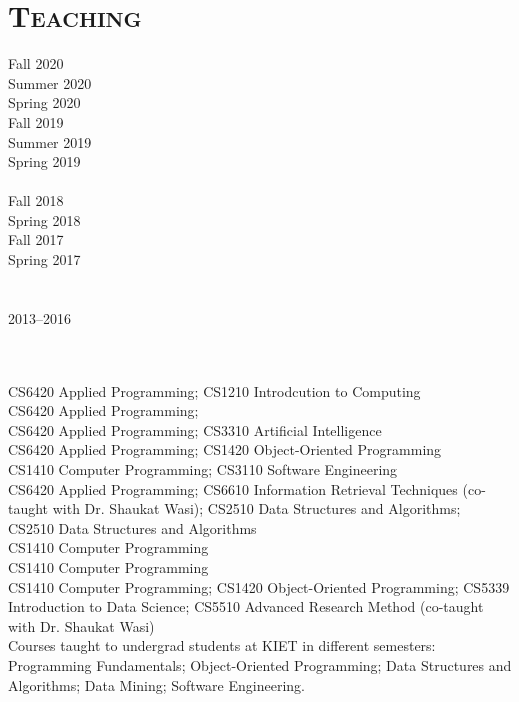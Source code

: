 \documentclass[a4paper, 10pt]{article}
\begin{document}
\section*{\normalfont\textsc{Teaching}}
\hfill\begin{minipage}{0.22\textwidth}
Fall 2020\textcolor{lightgray}{\dotfill}\\
Summer 2020\textcolor{lightgray}{\dotfill}\\
Spring 2020\textcolor{lightgray}{\dotfill}\\
Fall 2019\textcolor{lightgray}{\dotfill}\\
Summer 2019\textcolor{lightgray}{\dotfill}\\
Spring 2019\textcolor{lightgray}{\dotfill}\\\\
Fall 2018\textcolor{lightgray}{\dotfill}\\
Spring 2018\textcolor{lightgray}{\dotfill}\\
Fall 2017\textcolor{lightgray}{\dotfill}\\
Spring 2017\textcolor{lightgray}{\dotfill}\\\\\\
2013--2016\textcolor{lightgray}{\dotfill}\\\\\\
\end{minipage}
\begin{minipage}{0.75\textwidth}
CS6420 Applied Programming; CS1210 Introdcution to Computing\\
CS6420 Applied Programming;\\
CS6420 Applied Programming; CS3310 Artificial Intelligence\\
CS6420 Applied Programming; CS1420 Object-Oriented Programming\\
CS1410 Computer Programming; CS3110 Software Engineering\\
CS6420 Applied Programming; CS6610 Information Retrieval Techniques (co-taught with Dr. Shaukat Wasi); CS2510 Data Structures and Algorithms;\\
CS2510 Data Structures and Algorithms\\
CS1410 Computer Programming\\
CS1410 Computer Programming\\
CS1410 Computer Programming; CS1420 Object-Oriented Programming; CS5339 Introduction to Data Science; CS5510 Advanced Research Method (co-taught with Dr. Shaukat Wasi)\\
Courses taught to undergrad students at KIET in different semesters: Programming Fundamentals; Object-Oriented Programming; Data Structures and Algorithms; Data Mining; Software Engineering.\\%
\end{minipage}
\end{document}
